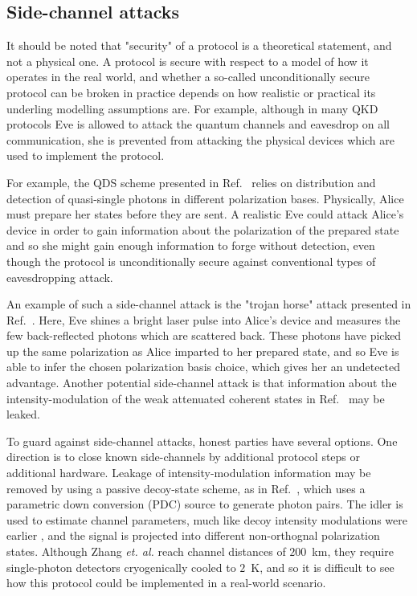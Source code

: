 \subsection{Side-channel attacks}
It should be noted that "security" of a protocol is a theoretical statement, and not a physical one. A protocol is secure with respect to a model of how it operates in the real world, and whether a so-called unconditionally secure protocol can be broken in practice depends on how realistic or practical its underling modelling assumptions are. For example, although in many QKD protocols Eve is allowed to attack the quantum channels and eavesdrop on all communication, she is prevented from attacking the physical devices which are used to implement the protocol. 

For example, the QDS scheme presented in Ref.~\cite{Amiri2016} relies on distribution and detection of quasi-single photons  in different polarization bases. Physically, Alice must prepare her states before they are sent. A realistic Eve could attack Alice's device in order to gain information about the polarization of the prepared state and so she might gain enough information to forge without detection, even though the protocol is unconditionally secure against conventional types of eavesdropping attack.

An example of such a side-channel attack  is the "trojan horse" attack presented in Ref.~\cite{Jain2014}. Here, Eve shines a bright laser pulse into Alice's device and measures the few back-reflected photons which are scattered back. These photons have picked up the same polarization as Alice imparted to her prepared state, and so Eve is able to infer the chosen polarization basis choice, which gives her an undetected advantage. Another potential side-channel attack is that information about the intensity-modulation of the weak attenuated coherent states in Ref.~\cite{Amiri2016, Yin2016c} may be leaked.



To guard against side-channel attacks, honest parties have several options. One direction is to close known side-channels by additional protocol steps or additional hardware. Leakage of intensity-modulation information may be removed by using a passive decoy-state scheme, as in Ref.~\cite{Zhang2018}, which uses a parametric down conversion (PDC) source to generate photon pairs. The idler is used to estimate channel parameters, much like decoy intensity modulations were earlier , and the signal is projected into different non-orthognal polarization states. Although Zhang \emph{et. al.} reach channel distances of $200$~km, they require single-photon detectors cryogenically cooled to $2$~K, and so it is difficult to see how this protocol could be implemented in a real-world scenario.


